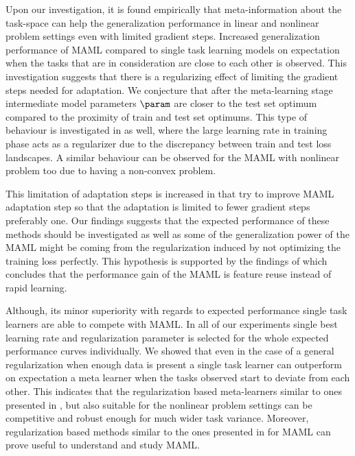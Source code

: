 Upon our investigation, it is found empirically that meta-information about the task-space can help the generalization performance in linear and nonlinear problem settings even with limited gradient steps. Increased generalization performance of MAML compared to single task learning models on expectation when the tasks that are in consideration are close to each other is observed. This investigation suggests that there is a regularizing effect of limiting the gradient steps needed for adaptation. We conjecture that after the meta-learning stage intermediate model parameters $\param$ are closer to the test set optimum compared to the proximity of train and test set optimums. This type of behaviour is investigated in \cite{nakkiran2020} as well, where the large learning rate in training phase acts as a regularizer due to the discrepancy between train and test loss landscapes. A similar behaviour can be observed for the MAML with nonlinear problem too due to having a non-convex problem. 

This limitation of adaptation steps is increased in \cite{behl2019, li2017b} that try to improve MAML adaptation step so that the adaptation is limited to fewer gradient steps preferably one. Our findings suggests that the expected performance of these methods should be investigated as well as some of the generalization power of the MAML might be coming from the regularization induced by not optimizing the training loss perfectly. This hypothesis is supported by the findings of \cite{raghu2020} which concludes that the performance gain of the MAML is feature reuse instead of rapid learning.

Although, its minor superiority with regards to expected performance single task learners are able to compete with MAML. In all of our experiments single best learning rate and regularization parameter is selected for the whole expected performance curves individually. We showed that even in the case of a general regularization when enough data is present a single task learner can outperform on expectation a meta learner when the tasks observed start to deviate from each other. This indicates that the regularization based meta-learners similar to ones presented in \cite{denevi2018}, but also suitable for the nonlinear problem settings  can be competitive and robust enough for much wider task variance. Moreover, regularization based methods similar to the ones presented in \cite{guiroy2019} for MAML can prove useful to understand and study MAML.


